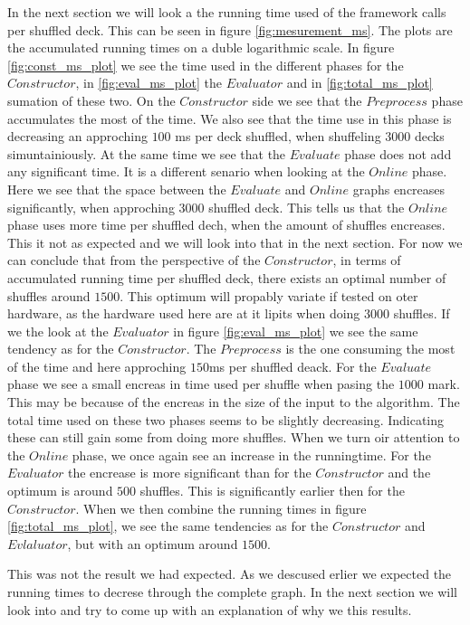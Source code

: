 \documentclass[twoside,11pt,openright]{report}
\begin{document}
In the next section we will look a the running time used of the framework calls per shuffled deck. This can be seen in figure \ref{fig:mesurement_ms}. The plots are the accumulated running times on a duble logarithmic scale. In figure \ref{fig:const_ms_plot} we see the time used in the different phases for the $Constructor$, in \ref{fig:eval_ms_plot} the $Evaluator$ and in \ref{fig:total_ms_plot} sumation of these two. On the $Constructor$ side we see that the $Preprocess$ phase accumulates the most of the time. We also see that the time use in this phase is decreasing an approching $100$ ms per deck shuffled, when shuffeling $3000$ decks simuntainiously. At the same time we see that the $Evaluate$ phase does not add any significant time. It is a different senario when looking at the $Online$ phase. Here we see that the space between the $Evaluate$ and $Online$ graphs encreases significantly, when approching $3000$ shuffled deck. This tells us that the $Online$ phase uses more time per shuffled dech, when the amount of shuffles encreases. This it not as expected and we will look into that in the next section. For now we can conclude that from the perspective of the $Constructor$, in terms of accumulated running time per shuffled deck, there exists an optimal number of shuffles around $1500$. This optimum will propably variate if tested on oter hardware, as the hardware used here are at it lipits when doing $3000$ shuffles.
If we the look at the $Evaluator$ in figure \ref{fig:eval_ms_plot} we see the same tendency as for the $Constructor$. The $Preprocess$ is the one consuming the most of the time and here approching $150$ms per shuffled deack. For the $Evaluate$ phase we see a small encreas in time used per shuffle when pasing the $1000$ mark. This may be because of the encreas in the size of the input to the algorithm. The total time used on these two phases seems to be slightly decreasing. Indicating these can still gain some from doing more shuffles. When we turn oir attention to the $Online$ phase, we once again see an increase in the runningtime. For the $Evaluator$ the encrease is more significant than for the $Constructor$ and the optimum is around $500$ shuffles. This is significantly earlier then for the $Constructor$. When we then combine the running times in figure \ref{fig:total_ms_plot}, we see the same tendencies as for the $Constructor$ and $Evlaluator$, but with an optimum around $1500$.

\bigskip

This was not the result we had expected. As we descused erlier we expected the running times to decrese through the complete graph. In the next section we will look into and try to come up with an explanation of why we this results.
\end{document}

